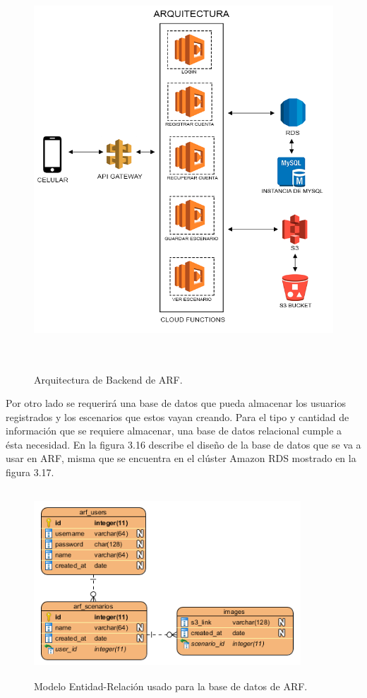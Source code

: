 \begin{figure}[H]
	\centering
	\includegraphics[width=15cm,height=15cm]{imagenes/desarrollo/arquitectura/ArchitecturaBackend.png}
	\caption{Arquitectura de Backend de ARF.}
	\label{fig:arqbackend}
\end{figure}
\par
Por otro lado se requerirá una base de datos que pueda almacenar los usuarios registrados y los escenarios que estos vayan creando. Para el tipo y cantidad de información que se requiere almacenar, una base de datos relacional cumple a ésta necesidad. En la figura  3.16 describe el diseño de la base de datos que se va a usar en ARF, misma que se encuentra en el clúster Amazon RDS mostrado en la figura 3.17.
\begin{figure}[H]
	\centering
	\includegraphics[width=10cm,height=7cm]{imagenes/desarrollo/arquitectura/ERD.png}
	\caption{Modelo Entidad-Relación usado para la base de datos de ARF.}
	\label{fig:arqbackend}
\end{figure}

